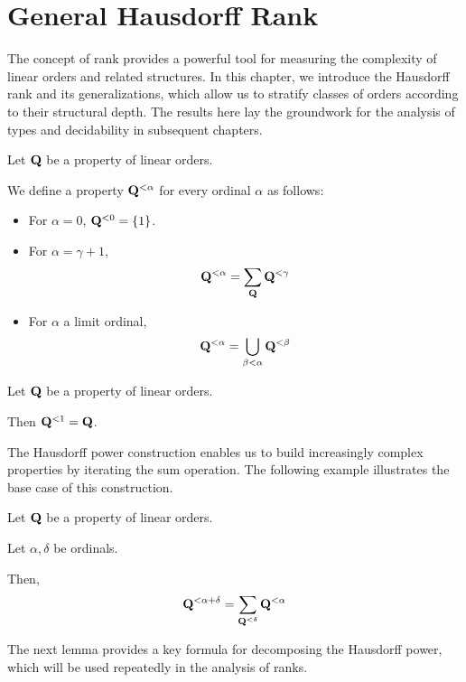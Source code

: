 \section{General Hausdorff Rank}

The concept of rank provides a powerful tool for measuring the complexity of linear orders and related structures. In this chapter, we introduce the Hausdorff rank and its generalizations, which allow us to stratify classes of orders according to their structural depth. The results here lay the groundwork for the analysis of types and decidability in subsequent chapters.

\begin{definition}
  Let $\mathbf{Q}$ be a property of linear orders.

  We define a property $\mathbf{Q}^{< \alpha}$
  for every ordinal $\alpha$ as follows:

  \begin{itemize}
    \item For $\alpha = 0$, $\mathbf{Q}^{< 0} = \left\{ {1} \right\}$.
    \item For $\alpha = \gamma + 1$,
          \[\mathbf{Q}^{< \alpha} = \sum_{\mathbf{Q}}{\mathbf{Q}^{< \gamma}}\]
    \item For $\alpha$ a limit ordinal,
          \[\mathbf{Q}^{< \alpha} = \bigcup_{\beta < \alpha} \mathbf{Q}^{< \beta}\]
  \end{itemize}
\end{definition}

\begin{example}
  Let $\mathbf{Q}$ be a property of linear orders.

  Then $\mathbf{Q}^{< 1} = \mathbf{Q}$.
\end{example}

The Hausdorff power construction enables us to build increasingly complex properties by iterating the sum operation. The
following example illustrates the base case of this construction.

\begin{lemma}\label{sum-of-ranks}
  Let $\mathbf{Q}$ be a property of linear orders.

  Let $\alpha, \delta$ be ordinals.

  Then,
  \[
    \mathbf{Q}^{< \alpha + \delta}
    = \sum_{\mathbf{Q}^{< \delta}}{\mathbf{Q}^{< \alpha}}
  \]
\end{lemma}

The next lemma provides a key formula for decomposing the Hausdorff power, which will be used repeatedly in the analysis of
ranks.

